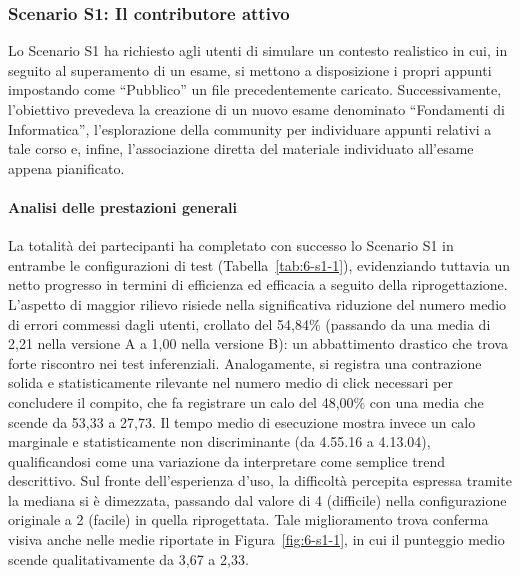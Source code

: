 \subsubsection{Scenario S1: Il contributore attivo}

Lo Scenario S1 ha richiesto agli utenti di simulare un contesto realistico in cui, in seguito al superamento di un esame, si mettono a disposizione i propri appunti impostando come ``Pubblico'' un file precedentemente caricato. Successivamente, l'obiettivo prevedeva la creazione di un nuovo esame denominato ``Fondamenti di Informatica'', l'esplorazione della community per individuare appunti relativi a tale corso e, infine, l'associazione diretta del materiale individuato all'esame appena pianificato.

\paragraph{Analisi delle prestazioni generali}

La totalità dei partecipanti ha completato con successo lo Scenario S1 in entrambe le configurazioni di test (Tabella~\ref{tab:6-s1-1}), evidenziando tuttavia un netto progresso in termini di efficienza ed efficacia a seguito della riprogettazione. L'aspetto di maggior rilievo risiede nella significativa riduzione del numero medio di errori commessi dagli utenti, crollato del 54,84\% (passando da una media di 2,21 nella versione A a 1,00 nella versione B): un abbattimento drastico che trova forte riscontro nei test inferenziali. Analogamente, si registra una contrazione solida e statisticamente rilevante nel numero medio di click necessari per concludere il compito, che fa registrare un calo del 48,00\% con una media che scende da 53,33 a 27,73. Il tempo medio di esecuzione mostra invece un calo marginale e statisticamente non discriminante (da 4.55.16 a 4.13.04), qualificandosi come una variazione da interpretare come semplice trend descrittivo. Sul fronte dell'esperienza d'uso, la difficoltà percepita espressa tramite la mediana si è dimezzata, passando dal valore di 4 (difficile) nella configurazione originale a 2 (facile) in quella riprogettata. Tale miglioramento trova conferma visiva anche nelle medie riportate in Figura~\ref{fig:6-s1-1}, in cui il punteggio medio scende qualitativamente da 3,67 a 2,33.

